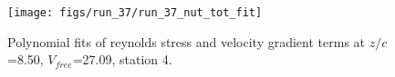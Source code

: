 \begin{figure}[H]
\centering
\texttt{[image: figs/run\_37/run\_37\_nut\_tot\_fit]}
\caption{Polynomial fits of reynolds stress and velocity gradient terms at $z/c$=8.50, $V_{free}$=27.09, station 4.}
\label{fig:run_37_nut_tot_fit}
\end{figure}



